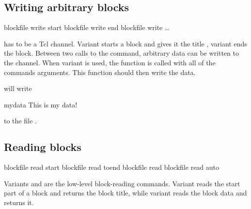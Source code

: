 \subsection{Writing arbitrary blocks}

\begin{essyntax}
   blockfile  write start 
   blockfile  write end
   blockfile  write  \dots
\end{essyntax}

 has to be a Tcl channel. Variant  starts a
block and gives it the title , variant  ends the
block. Between two calls to the command, arbitrary data can be written
to the channel.  When variant  is used, the function
 is called with all of the commands
arguments. This function should then write the data.


will write 
\begin{tclcode}
{mydata {This is my data!}}
\end{tclcode}
to the file .

\subsection{Reading blocks}

\begin{essyntax}
   blockfile  read start 
   blockfile  read toend 
   blockfile  read 
   blockfile  read auto 
\end{essyntax}

Variants  and  are the low-level block-reading
commands. Variant  reads the start part of a block and
returns the block title, while variant  reads the block
data and returns it.

